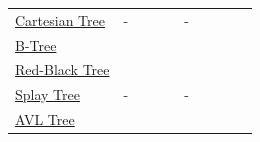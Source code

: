 \documentclass[10pt, letterpaper, landscape]{article}
\newcommand{\redbox}[1]{\psframebox[linecolor=textRed, fillstyle=solid, fillcolor=backRed, framearc=0.25]{\color{textRed}{#1}}}
\newcommand{\yellowbox}[1]{\psframebox[linecolor=textYellow, fillstyle=solid, fillcolor=backYellow, framearc=0.25]{\color{textYellow}{#1}}}
\newcommand{\greenbox}[1]{\psframebox[linecolor=textGreen, fillstyle=solid, fillcolor=backGreen, framearc=0.25]{\color{textGreen}{#1}}}
\begin{document}
\begin{table}[h!]
\begin{tabular}{llllllllll}
\href{https://en.wikipedia.org/wiki/Cartesian_tree}{Cartesian Tree} & - & \greenbox{$O(\log n)$} & \greenbox{$O(\log n)$} & \greenbox{$O(\log n)$} & - & \redbox{$O(n)$} & \redbox{$O(n)$} & \redbox{$O(n)$} & \yellowbox{$O(n)$}\\
\href{http://en.wikipedia.org/wiki/B_tree}{B-Tree} & \yellowbox{$O(\log n)$} & \greenbox{$O(\log n)$} & \greenbox{$O(\log n)$} & \greenbox{$O(\log n)$} & \yellowbox{$O(\log n)$} & \greenbox{$O(\log n)$} & \greenbox{$O(\log n)$} & \greenbox{$O(\log n)$} & \yellowbox{$O(n)$}\\
\href{http://en.wikipedia.org/wiki/Red-black_tree}{Red-Black Tree} & \yellowbox{$O(\log n)$} & \greenbox{$O(\log n)$} & \greenbox{$O(\log n)$} & \greenbox{$O(\log n)$} & \yellowbox{$O(\log n)$} & \greenbox{$O(\log n)$} & \greenbox{$O(\log n)$} & \greenbox{$O(\log n)$} & \yellowbox{$O(n)$}\\
\href{https://en.wikipedia.org/wiki/Splay_tree}{Splay Tree} & - & \greenbox{$O(\log n)$} & \greenbox{$O(\log n)$} & \greenbox{$O(\log n)$} & - & \greenbox{$O(\log n)$} & \greenbox{$O(\log n)$} & \greenbox{$O(\log n)$} & \yellowbox{$O(n)$}\\
\href{http://en.wikipedia.org/wiki/AVL_tree}{AVL Tree} & \yellowbox{$O(\log n)$} & \greenbox{$O(\log n)$} & \greenbox{$O(\log n)$} & \greenbox{$O(\log n)$} & \yellowbox{$O(\log n)$} & \greenbox{$O(\log n)$} & \greenbox{$O(\log n)$} & \greenbox{$O(\log n)$} & \yellowbox{$O(n)$}\\
\end{tabular}
\end{table}
%
%
\end{document}
